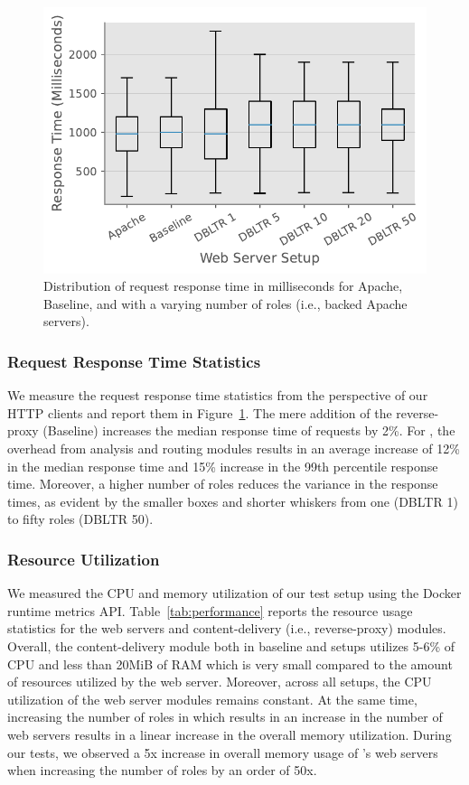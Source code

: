\begin{figure}[]
    \centering
    \includegraphics[width=0.55
    \textwidth]{figures/dbltr/performance.pdf}
    \caption{Distribution of request response time in milliseconds for Apache, Baseline, and \sys{} with a varying number of roles (i.e., backed Apache servers).}
    \label{fig:performance}
  \end{figure}

\subsubsection{Request Response Time Statistics}
We measure the request response time statistics from the perspective of our HTTP clients and report them in Figure~\ref{fig:performance}. 
The mere addition of the reverse-proxy (Baseline) increases the median response time of requests by 2\%. 
For \sys{}, the overhead from analysis and routing modules results in an average increase of 12\% in the median response time and 15\% increase in the 99th percentile response time. 
Moreover, a higher number of roles reduces the variance in the response times, as evident by the smaller boxes and shorter whiskers from one (DBLTR 1) to fifty roles (DBLTR 50). 

\subsubsection{Resource Utilization}
We measured the CPU and memory utilization of our test setup using the Docker runtime metrics API. 
Table~\ref{tab:performance} reports the resource usage statistics for the web servers and content-delivery (i.e., reverse-proxy) modules. 
Overall, the content-delivery module both in baseline and \sys{} setups utilizes 5-6\% of CPU and less than 20MiB of RAM which is very small compared to the amount of resources utilized by the web server. 
Moreover, across all setups, the CPU utilization of the web server modules remains constant. 
At the same time, increasing the number of roles in \sys{} which results in an increase in the number of web servers results in a linear increase in the overall memory utilization. 
During our tests, we observed a 5x increase in overall memory usage of \sys's web servers when increasing the number of roles by an order of 50x. 

